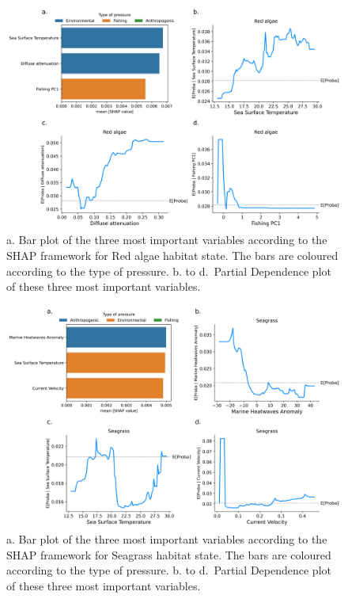 \begin{figure}
\hypertarget{fig:chap3figS46}{%
\centering
\includegraphics{03-Chapitre3/figures/supplementary/04-pdp_Red algae.png}
\caption{a. Bar plot of the three most important variables according to
the SHAP framework for Red algae habitat state. The bars are coloured
according to the type of pressure. b. to d.~Partial Dependence plot of
these three most important variables.}\label{fig:chap3figS46}
}
\end{figure}

\begin{figure}
\hypertarget{fig:chap3figS47}{%
\centering
\includegraphics{03-Chapitre3/figures/supplementary/04-pdp_Seagrass.png}
\caption{a. Bar plot of the three most important variables according to
the SHAP framework for Seagrass habitat state. The bars are coloured
according to the type of pressure. b. to d.~Partial Dependence plot of
these three most important variables.}\label{fig:chap3figS47}
}
\end{figure}

